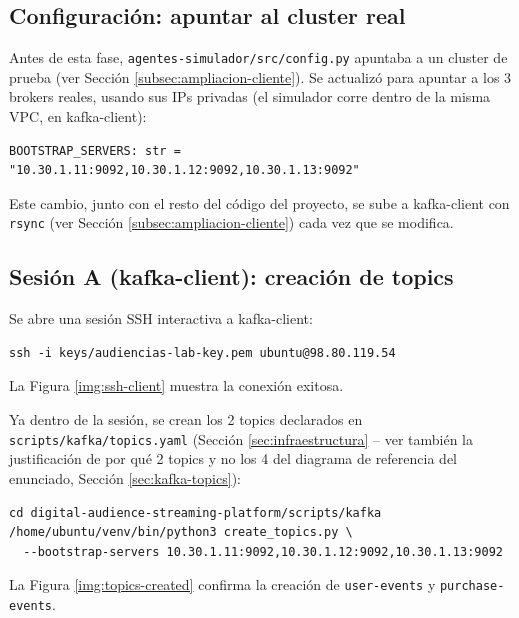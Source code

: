 \subsection{Configuración: apuntar al cluster real}

Antes de esta fase, \texttt{agentes-simulador/src/config.py} apuntaba a un cluster de prueba (ver Sección \ref{subsec:ampliacion-cliente}). Se actualizó para apuntar a los 3 brokers reales, usando sus IPs privadas (el simulador corre dentro de la misma VPC, en kafka-client):

\begin{lstlisting}[style=cmdbox]
BOOTSTRAP_SERVERS: str = "10.30.1.11:9092,10.30.1.12:9092,10.30.1.13:9092"
\end{lstlisting}

Este cambio, junto con el resto del código del proyecto, se sube a kafka-client con \texttt{rsync} (ver Sección \ref{subsec:ampliacion-cliente}) cada vez que se modifica.

\subsection{Sesión A (kafka-client): creación de topics}

Se abre una sesión SSH interactiva a kafka-client:

\begin{lstlisting}[style=cmdbox]
ssh -i keys/audiencias-lab-key.pem ubuntu@98.80.119.54
\end{lstlisting}

La Figura \ref{img:ssh-client} muestra la conexión exitosa.


Ya dentro de la sesión, se crean los 2 topics declarados en \texttt{scripts/kafka/topics.yaml} (Sección \ref{sec:infraestructura} -- ver también la justificación de por qué 2 topics y no los 4 del diagrama de referencia del enunciado, Sección \ref{sec:kafka-topics}):

\begin{lstlisting}[style=cmdbox]
cd digital-audience-streaming-platform/scripts/kafka
/home/ubuntu/venv/bin/python3 create_topics.py \
  --bootstrap-servers 10.30.1.11:9092,10.30.1.12:9092,10.30.1.13:9092
\end{lstlisting}

La Figura \ref{img:topics-created} confirma la creación de \texttt{user-events} y \texttt{purchase-events}.

